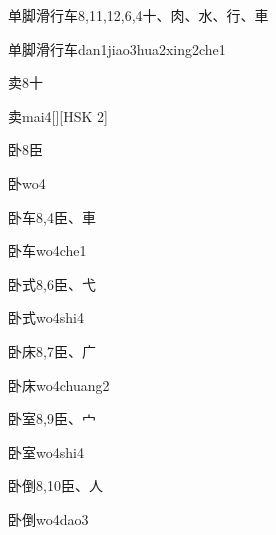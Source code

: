 \begin{entry}{单脚滑行车}{8,11,12,6,4}{⼗、⾁、⽔、⾏、⾞}
  \begin{phonetics}{单脚滑行车}{dan1jiao3hua2xing2che1}
  \end{phonetics}
\end{entry}

\begin{entry}{卖}{8}{⼗}
  \begin{phonetics}{卖}{mai4}[][HSK 2]
  \end{phonetics}
\end{entry}

\begin{entry}{卧}{8}{⾂}
  \begin{phonetics}{卧}{wo4}
  \end{phonetics}
\end{entry}

\begin{entry}{卧车}{8,4}{⾂、⾞}
  \begin{phonetics}{卧车}{wo4che1}
  \end{phonetics}
\end{entry}

\begin{entry}{卧式}{8,6}{⾂、⼷}
  \begin{phonetics}{卧式}{wo4shi4}
  \end{phonetics}
\end{entry}

\begin{entry}{卧床}{8,7}{⾂、⼴}
  \begin{phonetics}{卧床}{wo4chuang2}
  \end{phonetics}
\end{entry}

\begin{entry}{卧室}{8,9}{⾂、⼧}
  \begin{phonetics}{卧室}{wo4shi4}
  \end{phonetics}
\end{entry}

\begin{entry}{卧倒}{8,10}{⾂、⼈}
  \begin{phonetics}{卧倒}{wo4dao3}
  \end{phonetics}
\end{entry}

